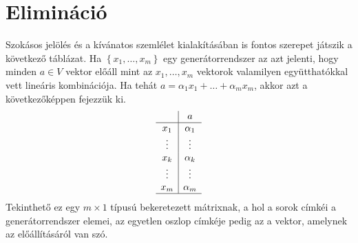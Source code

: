 \documentclass[9pt, showtrims]{memoir}
\theoremstyle{plain}
\theoremstyle{remark}
\theoremstyle{definition}
\begin{document}
\section{Elimináció}
Szokásos jelölés és a kívánatos szemlélet kialakításában is fontos szerepet játszik a következő táblázat.
Ha $\left\{ x_1,\dots,x_m \right\}$ egy generátorrendszer az azt jelenti, hogy minden $a\in V$ vektor
előáll mint az $x_1,\dots,x_m$ vektorok valamilyen együtthatókkal vett lineáris kombinációja.
Ha tehát $a=\alpha_1x_1+\dots+\alpha_mx_m$, akkor azt a következőképpen fejezzük ki.
\[
    \begin{array}{c|c}
        &a         \\
        \hline
        x_1         &\alpha_1   \\
        \vdots      &\vdots    \\
        x_k         &\alpha_k   \\
        \vdots      &\vdots    \\
        x_m         &\alpha_m   \\
        \hline
    \end{array}
\]
Tekinthető ez egy $m\times 1$ típusú bekeretezett mátrixnak, a hol a sorok címkéi a generátorrendszer elemei,
az egyetlen oszlop címkéje pedig az a vektor, amelynek az előállításáról van szó.
\end{document}
